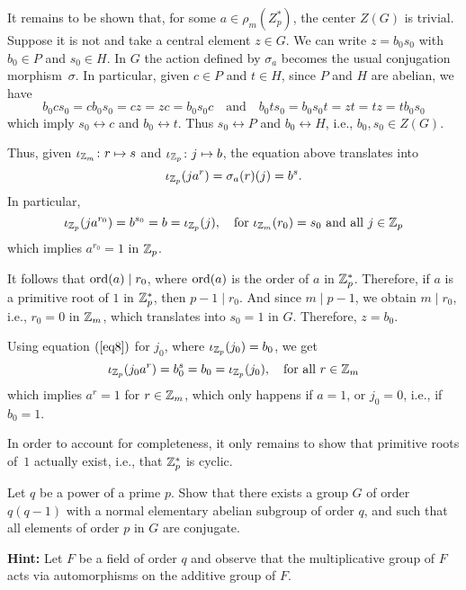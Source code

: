 \begin{solution}
It remains to be shown that, for some $a\in\rho_m(Z_p^*)$, the center $Z(G)$ is trivial. Suppose it is not and take a central element $z\in G$. We can write $z=b_0s_0$ with $b_0\in P$ and $s_0\in H$. In $G$ the action defined by $\sigma_a$ becomes the usual conjugation morphism~$\sigma$. In particular, given $c\in P$ and $t\in H$, since $P$ and $H$ are abelian, we have
$$
    b_0cs_0 = cb_0s_0 = cz = zc = b_0s_0c
        \quad\text{and}\quad b_0ts_0 = b_0s_0t = zt = tz = tb_0s_0
$$
which imply $s_0\leftrightarrow c$ and $b_0\leftrightarrow t$. Thus $s_0\leftrightarrow P$ and $b_0\leftrightarrow H$, i.e., $b_0,s_0\in Z(G)$.

Thus, given $\iota_{\mathbb{Z}_m}\colon r\mapsto s$ and $\iota_{\mathbb{Z}_p}\colon j\mapsto b$, the equation above translates into
\begin{equation}\label{eq8}
    \iota_{\mathbb{Z}_p}(ja^r) = \sigma_a(r)(j) = b^s.
\end{equation}
In particular,
$$
    \iota_{\mathbb{Z}_p}(ja^{r_0}) = b^{s_0} = b = \iota_{\mathbb{Z}_p}(j),
        \quad\text{for }\iota_{\mathbb{Z}_m}(r_0)=s_0\text{ and all }j\in\mathbb{Z}_p 
$$
which implies $a^{r_0}=1$ in $\mathbb{Z}_p$.

It follows that ${\rm ord}(a)\mid r_0$, where ${\rm ord}(a)$ is the order of $a$ in $\mathbb{Z}_p^*$. Therefore, if $a$ is a primitive root of $1$ in $\mathbb{Z}_p^*$, then $p-1\mid r_0$. And since $m\mid p-1$, we obtain $m\mid r_0$, i.e., $r_0=0$ in $\mathbb{Z}_m$, which translates into $s_0=1$ in $G$. Therefore, $z=b_0$.

Using equation $(\ref{eq8})$ for $j_0$, where $\iota_{\mathbb{Z}_p}(j_0)=b_0$, we get
$$
    \iota_{\mathbb{Z}_p}(j_0a^r)=b_0^s=b_0 = \iota_{\mathbb{Z}_p}(j_0),
        \quad\text{for all }r\in\mathbb{Z}_m
$$
which implies $a^r=1$ for $r\in\mathbb{Z}_m$, which only happens if $a=1$, or $j_0=0$, i.e., if $b_0=1$.

In order to account for completeness, it only remains to show that primitive roots of~$1$ actually exist, i.e., that $\mathbb{Z}_p^*$ is cyclic.

\medskip


\begin{probl}
    Let\/ $q$ be a power of a prime\/ $p$. Show that there exists a group\/ $G$ of order\/ $q(q-1)$ with a normal elementary abelian subgroup of order\/ $q$, and such that all elements of order\/ $p$ in\/ $G$ are conjugate.

    \textrm{\rm\textbf{Hint:} Let $F$ be a field of order $q$ and observe that the multiplicative group of $F$ acts via automorphisms on the additive group of $F$.}
\end{probl}


\end{solution}

